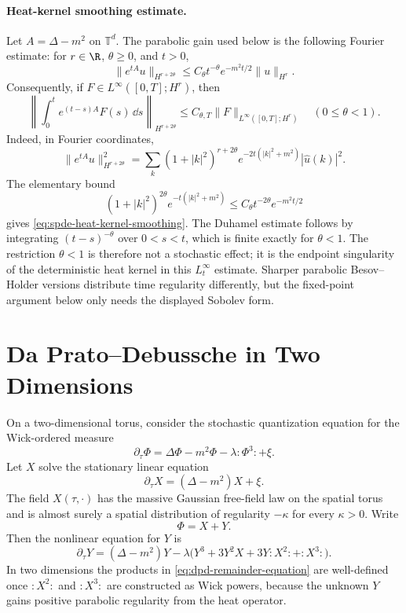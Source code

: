 \paragraph{Heat-kernel smoothing estimate.}
Let \(A=\Delta-m^2\) on \(\mathbb T^d\).  The parabolic gain used below is the
following Fourier estimate: for \(r\in\R\), \(\theta\geq0\), and \(t>0\),
\begin{equation}
  \|e^{tA}u\|_{H^{r+2\theta}}
  \leq
  C_\theta t^{-\theta}e^{-m^2t/2}\|u\|_{H^r}.
  \label{eq:spde-heat-kernel-smoothing}
\end{equation}
Consequently, if \(F\in L^\infty([0,T];H^r)\), then
\begin{equation}
  \left\|
    \int_0^t e^{(t-s)A}F(s)\,\dd s
  \right\|_{H^{r+2\theta}}
  \leq
  C_{\theta,T}\|F\|_{L^\infty([0,T];H^r)}
  \quad(0\leq\theta<1).
  \label{eq:spde-duhamel-smoothing}
\end{equation}
Indeed, in Fourier coordinates,
\[
  \|e^{tA}u\|_{H^{r+2\theta}}^2
  =
  \sum_k
  (1+|k|^2)^{r+2\theta}
  e^{-2t(|k|^2+m^2)}
  |\widehat u(k)|^2 .
\]
The elementary bound
\[
  (1+|k|^2)^{2\theta}e^{-t(|k|^2+m^2)}
  \leq C_\theta t^{-2\theta}e^{-m^2t/2}
\]
gives \eqref{eq:spde-heat-kernel-smoothing}.  The Duhamel estimate follows
by integrating
\((t-s)^{-\theta}\) over \(0<s<t\), which is finite exactly for
\(\theta<1\).
The restriction \(\theta<1\) is therefore not a stochastic effect; it is the
endpoint singularity of the deterministic heat kernel in this \(L^\infty_t\)
estimate.  Sharper parabolic Besov--Holder versions distribute time
regularity differently, but the fixed-point argument below only needs the
displayed Sobolev form.

\section{Da Prato--Debussche in Two Dimensions}

On a two-dimensional torus, consider the stochastic quantization equation
for the Wick-ordered measure
\begin{equation}
  \partial_\tau\Phi
  =
  \Delta\Phi-m^2\Phi-\lambda:\!\Phi^3\!:+\xi .
  \label{eq:dpd-phi-four-two}
\end{equation}
Let \(X\) solve the stationary linear equation
\begin{equation}
  \partial_\tau X=(\Delta-m^2)X+\xi .
  \label{eq:ornstein-uhlenbeck-field}
\end{equation}
The field \(X(\tau,\cdot)\) has the massive Gaussian free-field law on the
spatial torus and is almost surely a spatial distribution of regularity
\(-\kappa\) for every \(\kappa>0\).  Write
\[
  \Phi=X+Y.
\]
Then the nonlinear equation for \(Y\) is
\begin{equation}
  \partial_\tau Y
  =
  (\Delta-m^2)Y
  -\lambda\bigl(
    Y^3+3Y^2X+3Y:\!X^2\!:+:\!X^3\!:
  \bigr).
  \label{eq:dpd-remainder-equation}
\end{equation}
In two dimensions the products in
\eqref{eq:dpd-remainder-equation} are well-defined once
\(:\!X^2\!:\) and \(:\!X^3\!:\) are constructed as Wick powers, because the
unknown \(Y\) gains positive parabolic regularity from the heat operator.

